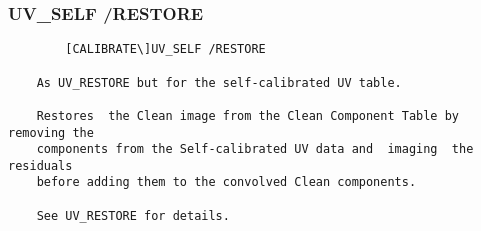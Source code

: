 \subsubsection{UV\_SELF /RESTORE}
\begin{verbatim}
        [CALIBRATE\]UV_SELF /RESTORE

    As UV_RESTORE but for the self-calibrated UV table.

    Restores  the Clean image from the Clean Component Table by removing the
    components from the Self-calibrated UV data and  imaging  the  residuals
    before adding them to the convolved Clean components.

    See UV_RESTORE for details.


\end{verbatim}
